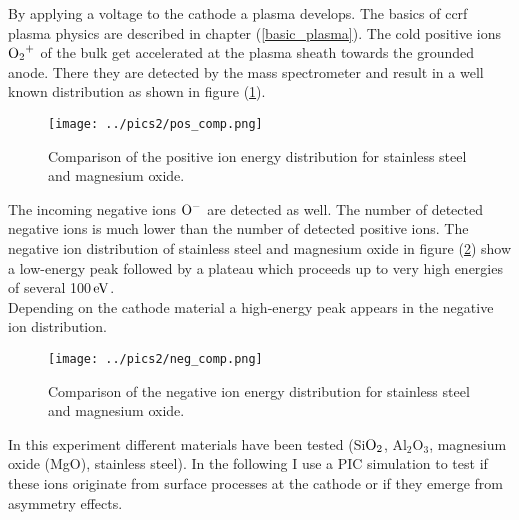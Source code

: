 By applying a voltage to the cathode a plasma develops. 
The basics of ccrf plasma physics are described in chapter (\ref{basic_plasma}).
The cold positive ions $\rm{O_2}^{+}$  of the bulk get accelerated at the plasma sheath towards the grounded anode. 
There they are detected by the mass spectrometer and result in a well known distribution \cite{ccrf} as shown in figure (\ref{fig:normal_distribution}). 
\begin{figure}[htbp]
    \centering
    \texttt{[image: ../pics2/pos\_comp.png]}
    \caption{Comparison of the positive ion energy distribution for stainless steel and magnesium oxide.}
    \label{fig:normal_distribution}
\end{figure}
The incoming negative ions $\rm{O}^-$ are detected as well. 
The number of detected negative ions is much lower than the number of detected positive ions.
The negative ion distribution of stainless steel and magnesium oxide in figure (\ref{fig:MgO}) show a low-energy peak followed by a plateau which proceeds up to very high energies of several 100$\,\mathrm{eV}$. \\
Depending on the cathode material a high-energy peak appears in the negative ion distribution. 
\begin{figure}[htbp]
    \centering
    \texttt{[image: ../pics2/neg\_comp.png]}
    \caption{Comparison of the negative ion energy distribution for stainless steel and magnesium oxide.}
    \label{fig:MgO}
\end{figure}

In this experiment different materials have been tested (Si$\rm{O}_2$, Al$_2$O$_3$, magnesium oxide (MgO), stainless steel).
In the following I use a PIC simulation to test if these ions originate from surface processes at the cathode or if they emerge from asymmetry effects.\\



